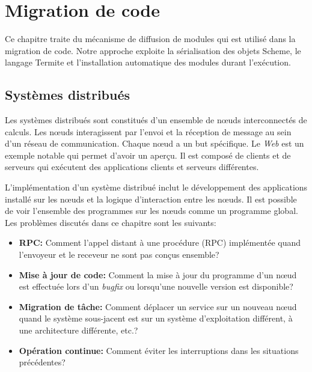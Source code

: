 \chapter{Migration de code}
\label{ch:task_migration}

Ce chapitre traite du mécanisme de diffusion de modules qui est utilisé dans
la migration de code. Notre approche exploite la sérialisation des objets
Scheme, le langage Termite et l'installation automatique des modules durant
l'exécution.

\section{Systèmes distribués}

Les systèmes distribués sont constitués d'un ensemble de nœuds interconnectés
de calculs. Les nœuds interagissent par l'envoi et la réception de message
au sein d'un réseau de communication. Chaque nœud a un but spécifique. Le
\textit{Web} est un exemple notable qui permet d'avoir un aperçu.
Il est composé de clients et de serveurs qui exécutent
des applications clients et serveurs différentes.

L'implémentation d'un système distribué inclut le développement des applications
installé sur les nœuds et la logique d'interaction entre les nœuds. Il est
possible de voir l'ensemble des programmes sur les nœuds comme un programme
global. Les problèmes discutés dans ce chapitre sont les suivants:

\begin{itemize}

  \item {\bf RPC:} Comment l'appel distant à une procédure (RPC)
    implémentée quand l'envoyeur et le receveur ne sont pas conçus
    ensemble?

  \item {\bf Mise à jour de code:} Comment la mise à jour du programme d'un
    nœud est effectuée lors d'un \textit{bugfix} ou lorsqu'une nouvelle
    version est disponible?

  \item {\bf Migration de tâche:} Comment déplacer un service sur un nouveau
    nœud quand le système sous-jacent est sur un système d'exploitation
    différent, à une architecture différente, etc.?

  \item {\bf Opération continue:} Comment éviter les interruptions dans les
    situations précédentes?

\end{itemize}

